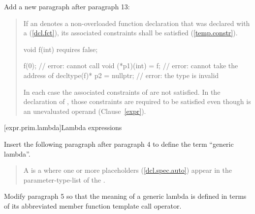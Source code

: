 Add a new paragraph after paragraph 13:

\begin{quote}
\setcounter{Paras}{13}
\pnum
If an  denotes a non-overloaded function 
declaration that was declared with a 
(\ref{dcl.fct}), its associated constraints shall be satisfied
(\ref{temp.constr}).
\enterexample
\begin{codeblock}
void f(int) requires false;

f(0);                      // error: cannot call 
void (*p1)(int) = f;       // error: cannot take the address of 
decltype(f)* p2 = nullptr; // error: the type  is invalid
\end{codeblock}
In each case the associated constraints of  are not satisfied. In the 
declaration of , those constraints are required to be satisfied even 
though  is an unevaluated operand (Clause~\ref{expr}).
\exitexample
\end{quote}


[expr.prim.lambda]{Lambda expressions}

Insert the following paragraph after paragraph 4 to define the
term ``generic lambda''. 

\begin{quote}
\setcounter{Paras}{4}
\pnum
A  is a  where one
or more placeholders (\ref{dcl.spec.auto}) appear in the parameter-type-list
of the .
\end{quote}

Modify paragraph 5 so that the meaning of a generic lambda is defined 
in terms of its abbreviated member function template call operator.

